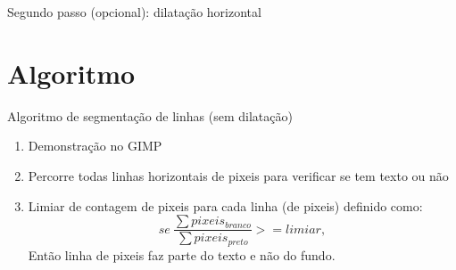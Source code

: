 \documentclass{beamer}
\begin{document}
\begin{frame}{Segundo passo (opcional): dilatação horizontal}
\end{frame}

\section{Algoritmo}

\begin{frame}{Algoritmo de segmentação de linhas (sem dilatação)}
    
\begin{enumerate}
    \item Demonstração no GIMP
    \item Percorre todas linhas horizontais de pixeis para verificar se tem texto ou não
    \item Limiar de contagem de pixeis para cada linha (de pixeis) definido como:
    $$se \ \frac{\sum{pixeis_{branco}}}{\sum{pixeis_{preto}}} >= limiar,$$
    Então linha de pixeis faz parte do texto e não do fundo.
\end{enumerate}

\end{frame}
\end{document}
